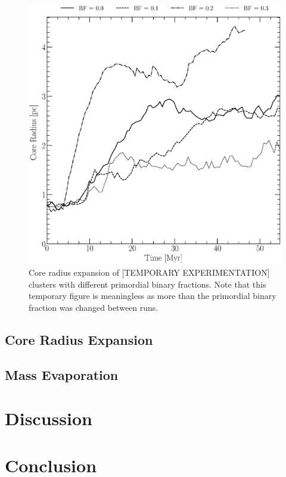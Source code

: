 \documentclass[twocolumn]{aastex62}
\begin{document}
\begin{figure}
    \centering
    \includegraphics[scale=0.35]{Figures/core_radius_expansion.eps}
    \caption{Core radius expansion of [TEMPORARY EXPERIMENTATION] clusters with different primordial binary fractions. Note that this temporary figure is meaningless as more than the primordial binary fraction was changed between runs.}
    \label{fig:RCexpand}
\end{figure}

\subsection{Core Radius Expansion}

\subsection{Mass Evaporation}

\section{Discussion}\label{sec:disscussion}

\section{Conclusion}\label{sec:conclusion}
\end{document}
